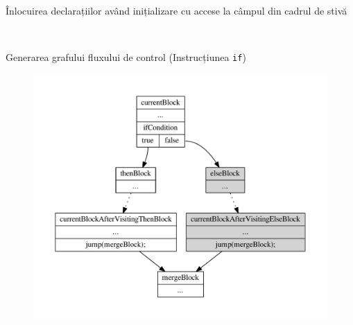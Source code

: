 \documentclass{beamer}
\def\code#1{\texttt{#1}}
\begin{document}
\begin{frame}{Înlocuirea declarațiilor având inițializare cu accese la câmpul din cadrul de stivă}
    \begin{figure}[htb]
        \\
    \end{figure}
\end{frame}

\begin{frame}{Generarea grafului fluxului de control (Instrucțiunea \code{if})}
    \begin{figure}[htb]
        \centering
        \includegraphics[width=.7\textwidth]{../../../theses/diploma/src/graph/if.pdf}
    \end{figure}
\end{frame}
\end{document}
